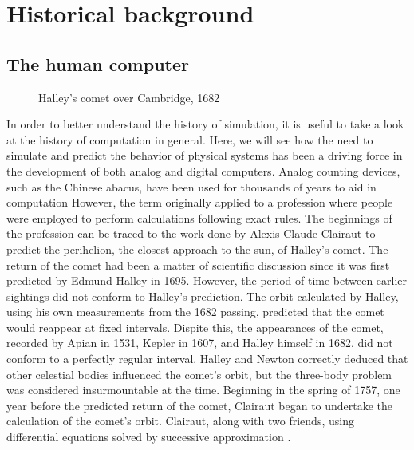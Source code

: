 \documentclass[../main.tex]{subfiles}
\begin{document}
\chapter{Historical background} %

\label{Chapter01} %


\section{The human computer}

\begin{figure}[ht]
    \caption{Halley's comet over Cambridge, 1682}
    \label{fig:comet}
\end{figure}

In order to better understand the history of simulation, it is useful to take a look at the history of computation in general.
Here, we will see how the need to simulate and predict the behavior of physical systems has been a driving force in the development of both analog and digital computers.
Analog counting devices, such as the Chinese abacus, have been used for thousands of years to aid in computation
However, the term originally applied to a profession where people were employed to perform calculations following exact rules.
The beginnings of the profession can be traced to the work done by Alexis-Claude Clairaut to predict the perihelion, the closest approach to the sun, of Halley's comet.
The return of the comet had been a matter of scientific discussion since it was first predicted by Edmund Halley in 1695.
However, the period of time between earlier sightings did not conform to Halley's prediction.
The orbit calculated by Halley, using his own measurements from the 1682 passing, predicted that the comet would reappear at fixed intervals.
Dispite this, the appearances of the comet, recorded by Apian in 1531, Kepler in 1607, and Halley himself in 1682, did not conform to a perfectly regular interval.
Halley and Newton correctly deduced that other celestial bodies influenced the comet's orbit, but the three-body problem was considered insurmountable at the time.
Beginning in the spring of 1757, one year before the predicted return of the comet, Clairaut began to undertake the calculation of the comet's orbit.
Clairaut, along with two friends, using differential equations solved by successive approximation \cite{wilson1993}.
\end{document}
